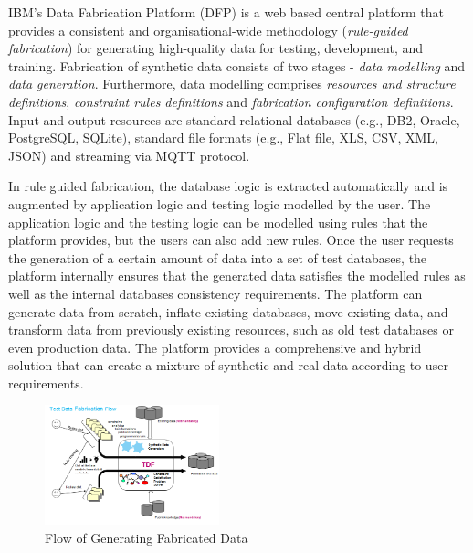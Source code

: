 

\noindent
\label{sec:dfp}
IBM’s Data Fabrication Platform (DFP) is a web based central platform that provides a consistent and organisational-wide methodology (\emph{rule-guided fabrication}) for generating high-quality data for testing, development, and training. Fabrication of synthetic data consists of two stages - \emph{data modelling} and \emph{data generation}. Furthermore, data modelling comprises \emph{resources and structure definitions}, \emph{constraint rules definitions} and \emph{fabrication configuration definitions}. Input and output resources are standard relational databases (e.g., DB2, Oracle, PostgreSQL, SQLite), standard file formats (e.g., Flat file, XLS, CSV, XML, JSON) and streaming via MQTT protocol.

In rule guided fabrication, the database logic is extracted automatically and is augmented by application logic and testing logic modelled by the user. The application logic and the testing logic can be modelled using rules that the platform provides, but the users can also add new rules. Once the user requests the generation of a certain amount of data into a set of test databases, the platform internally ensures that the generated data satisfies the modelled rules as well as the internal databases consistency requirements. The platform can generate data from scratch, inflate existing databases, move existing data, and transform data from previously existing resources, such as old test databases or even production data. The platform provides a comprehensive and hybrid solution that can create a mixture of synthetic and real data according to user requirements.

\begin{figure}
    \centering
    \includegraphics[width=0.45\textwidth]{images/DFPPlatformFlow.png}
    \caption{Flow of Generating Fabricated Data}
    \label{fig:dataFab}
\end{figure}

